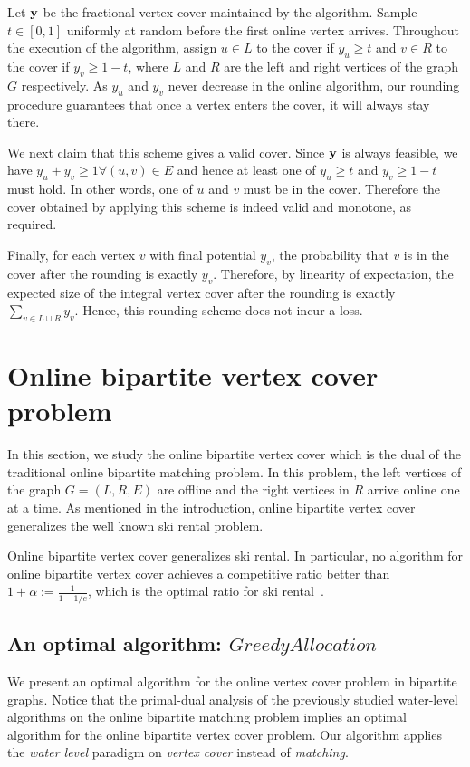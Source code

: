 \documentclass{article}
\newcommand{\by}{{\bf{y}}}
\begin{document}
Let ${\bf y}$ be the fractional vertex cover maintained by the algorithm. %
Sample $t\in [0,1]$ uniformly at random before the first online vertex arrives. Throughout the execution of the algorithm, assign $u\in L$  to the cover if $y_u\geq t$ and $v\in R$ to the cover if $y_v\geq 1-t$, where $L$ and $R$ are the left and right vertices of the graph $G$ respectively.
As $y_u$ and $y_v$ never decrease in the online algorithm, our rounding procedure guarantees that once a vertex enters the cover, it will always stay there. 

We next claim that this scheme gives a valid cover. Since $\by$ is always feasible, we have $y_u+y_v\geq 1\forall (u,v)\in E$ and hence at least one of $y_u\geq t$ and $y_v\geq 1-t$ must hold. In other words, one of $u$ and $v$ must be in the cover.
Therefore the cover obtained by applying this scheme is indeed valid and monotone, as required.

Finally, for each vertex $v$ with final potential $y_v$, the probability that $v$ is in the cover after the rounding is exactly $y_v$. Therefore, by linearity of expectation, the expected size of the integral vertex cover after the rounding is exactly $\sum_{v\in L\cup R} y_v$. Hence, this rounding scheme does not incur a loss.

\section{Online bipartite vertex cover problem}

In this section, we study the online bipartite vertex cover which is the dual of the traditional online bipartite matching problem. In this problem, the left vertices of the graph $G=(L,R,E)$ are offline and the right vertices in $R$ arrive online one at a time.
As mentioned in the introduction, online bipartite vertex cover generalizes the well known ski rental problem.
\begin{lemma}
Online bipartite vertex cover generalizes ski rental. In particular, no algorithm for online bipartite vertex cover achieves a competitive ratio better than $1+\alpha:=\frac{1}{1-1/e}$, which is the optimal ratio for ski rental~\cite{Karlin1994}.
\end{lemma}

\subsection{An optimal algorithm: $GreedyAllocation$}
\label{subsec:greedyallocation}
We present an optimal algorithm for the online vertex cover problem in bipartite graphs.  Notice that the primal-dual analysis of the previously studied water-level algorithms on the online bipartite matching problem implies an optimal algorithm for the online bipartite vertex cover problem. Our algorithm applies the {\em water level} paradigm on {\em vertex cover} instead of {\em matching}. 
\end{document}
